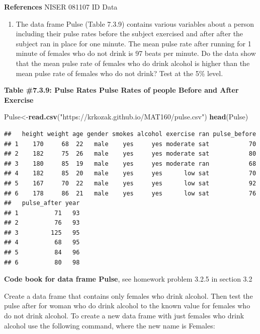 \documentclass[]{book}
\newenvironment{Shaded}{\begin{snugshade}}{\end{snugshade}}
\newcommand{\KeywordTok}[1]{\textcolor[rgb]{0.13,0.29,0.53}{\textbf{#1}}}
\newcommand{\NormalTok}[1]{#1}
\newcommand{\StringTok}[1]{\textcolor[rgb]{0.31,0.60,0.02}{#1}}
\providecommand{\tightlist}{%
  \setlength{\itemsep}{0pt}\setlength{\parskip}{0pt}}
\begin{document}
\textbf{References}
NISER 081107 ID Data

\begin{enumerate}
\def\labelenumi{\arabic{enumi}.}
\setcounter{enumi}{3}
\tightlist
\item
  The data frame Pulse (Table 7.3.9) contains various variables about a person including their pulse rates before the subject exercised and after after the subject ran in place for one minute. The mean pulse rate after running for 1 minute of females who do not drink is 97 beats per minute. Do the data show that the mean pulse rate of females who do drink alcohol is higher than the mean pulse rate of females who do not drink? Test at the 5\% level.
\end{enumerate}

\textbf{Table \#7.3.9: Pulse Rates Pulse Rates of people Before and After Exercise}

\begin{Shaded}
\begin{Highlighting}[]
\NormalTok{Pulse<-}\KeywordTok{read.csv}\NormalTok{(}\StringTok{"https://krkozak.github.io/MAT160/pulse.csv"}\NormalTok{)}
\KeywordTok{head}\NormalTok{(Pulse)}
\end{Highlighting}
\end{Shaded}

\begin{verbatim}
##   height weight age gender smokes alcohol exercise ran pulse_before
## 1    170     68  22   male    yes     yes moderate sat           70
## 2    182     75  26   male    yes     yes moderate sat           80
## 3    180     85  19   male    yes     yes moderate ran           68
## 4    182     85  20   male    yes     yes      low sat           70
## 5    167     70  22   male    yes     yes      low sat           92
## 6    178     86  21   male    yes     yes      low sat           76
##   pulse_after year
## 1          71   93
## 2          76   93
## 3         125   95
## 4          68   95
## 5          84   96
## 6          80   98
\end{verbatim}

\textbf{Code book for data frame Pulse}, see homework problem 3.2.5 in section 3.2

Create a data frame that contains only females who drink alcohol. Then test the pulse after for woman who do drink alcohol to the known value for females who do not drink alcohol. To create a new data frame with just females who drink alcohol use the following command, where the new name is Females:
\end{document}
